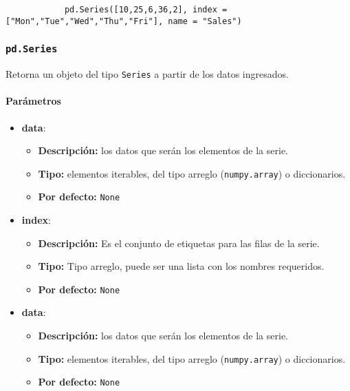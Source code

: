     \begin{verbatim}
            pd.Series([10,25,6,36,2], index = ["Mon","Tue","Wed","Thu","Fri"], name = "Sales")
            \end{verbatim}
    \subsubsection{\texttt{pd.Series}} Retorna un objeto del tipo \texttt{Series} a partir de los datos ingresados.

    \paragraph{Parámetros}
    \begin{itemize}
        \item \textbf{data}:
            \begin{itemize}
                \item \textbf{Descripción:} los datos que serán los elementos de la serie.
                \item \textbf{Tipo:} elementos iterables, del tipo arreglo (\texttt{numpy.array}) o diccionarios.
                \item \textbf{Por defecto:} \texttt{None}
            \end{itemize}
        \item \textbf{index}:
            \begin{itemize}
                \item \textbf{Descripción:} Es el conjunto de etiquetas para las filas de la serie.
                \item \textbf{Tipo:} Tipo arreglo, puede ser una lista con los nombres requeridos.
                \item \textbf{Por defecto:} \texttt{None}
            \end{itemize}
        \item \textbf{data}:
            \begin{itemize}
                \item \textbf{Descripción:} los datos que serán los elementos de la serie.
                \item \textbf{Tipo:} elementos iterables, del tipo arreglo (\texttt{numpy.array}) o diccionarios.
                \item \textbf{Por defecto:} \texttt{None}
            \end{itemize}
    \end{itemize}


